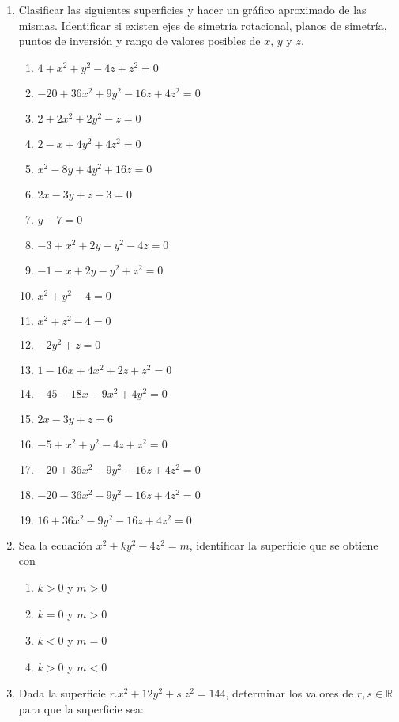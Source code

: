 \documentclass[a4paper]{article}
\newcommand{\exercise}{\item}
\begin{document}
\begin{enumerate}
	\exercise Clasificar las siguientes superficies y hacer un gráfico aproximado de las mismas. Identificar si existen ejes de simetría rotacional, planos de simetría, puntos de inversión y rango de valores posibles de $x$, $y$ y $z$.
	\begin{multicols}{2}
	\begin{enumerate} [label=(\alph*)]
		\item $4+x^2+y^2-4z+z^2=0$
		\item $-20+36x^2+9y^2-16z+4z^2=0$
		\item $2+2x^2+2y^2-z=0$
		\item $2-x+4y^2+4z^2=0$
		\item $x^2-8y+4y^2+16z=0$
		\item $2x-3y+z-3=0$
		\item $y-7=0$
		\item $-3+x^2+2y-y^2-4z=0$
		\item $-1-x+2y-y^2+z^2=0$
		\item $x^2+y^2-4=0$
		\item $x^2+z^2-4=0$
		\item $-2y^2+z=0$
		\item $1-16x+4x^2+2z+z^2=0$
		\item $-45-18x-9x^2+4y^2=0$
		\item $2x-3y+z=6$
		\item $-5+x^2+y^2-4z+z^2=0$
		\item $-20+36x^2-9y^2-16z+4z^2=0$
		\item $-20-36x^2-9y^2-16z+4z^2=0$
		\item $16+36x^2-9y^2-16z+4z^2=0$
	\end{enumerate}
	\end{multicols}
	\exercise Sea la ecuación $x^2+ky^2-4z^2=m$, identificar la superficie que se obtiene con
	\begin{multicols}{2}
	\begin{enumerate} [label=(\alph*)]
		\item $k>0$ y $m>0$
		\item $k=0$ y $m>0$
		\item $k<0$ y $m=0$
		\item $k>0$ y $m<0$
	\end{enumerate}
	\end{multicols}
	\exercise Dada la superficie $r.x^2+12y^2+s.z^2=144$, determinar los valores de $r,s \in \mathbb{R}$ para que la superficie sea:
	\begin{multicols}{2}
	\begin{enumerate} [label=(\alph*)]

\end{enumerate}
\end{multicols}
\end{enumerate}
\end{document}
